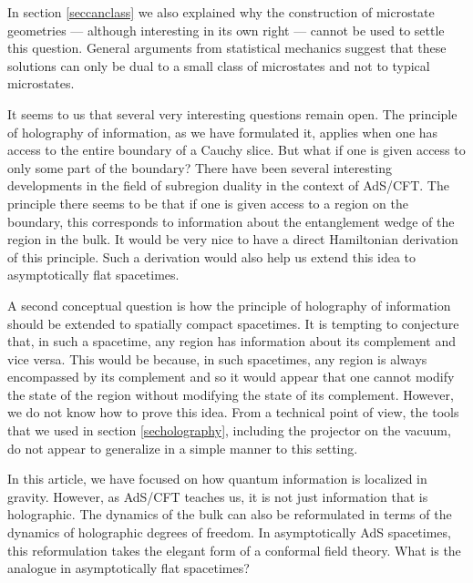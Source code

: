 \documentclass[12pt]{article}
\begin{document}
In section \ref{seccanclass} we also explained  why the construction of microstate geometries --- although interesting in its own right --- cannot be used to settle this question. General arguments from statistical mechanics suggest that these solutions can only be dual to a small class of microstates and not to typical microstates.

It seems to us that several very interesting questions remain open. The principle of holography of information, as we have formulated it, applies when one has access to the entire boundary of a Cauchy slice. But what if one is given access to only some part of the boundary? There have been several interesting developments in the field of subregion duality in the context of AdS/CFT. The principle there seems to be that if one is given access to a region on the boundary, this corresponds to information about the entanglement wedge of the region in the bulk. It would be very nice to have a direct Hamiltonian derivation of this principle. Such a derivation would also help us extend this idea to asymptotically flat spacetimes.

A second conceptual question is how the principle of holography of information should be extended to spatially compact spacetimes. It is tempting to conjecture that, in such a spacetime, any region has information about its complement and vice versa. This would be because, in such spacetimes, any region is always encompassed by its complement  and so it would appear that one cannot modify the state of the region without modifying the state of its complement. However, we do not know how to prove this idea. From a technical point of view, the tools that we used in section \ref{secholography}, including the projector on the vacuum, do not appear to generalize in a simple manner to this setting.

In this article, we have focused on how quantum information is localized in gravity. However, as AdS/CFT teaches us, it is not just information that is holographic. The dynamics of the bulk can also be reformulated in terms of the dynamics of holographic degrees of freedom. In asymptotically AdS spacetimes, this reformulation takes the elegant form of a conformal field theory. What is the analogue in asymptotically flat spacetimes? 
\end{document}
